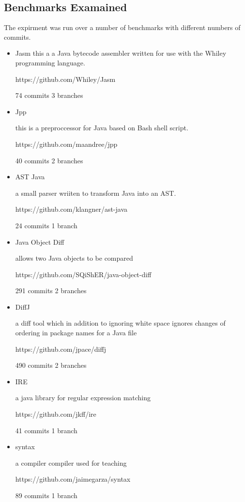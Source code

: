 \subsection{Benchmarks Examained}
 The expirment was run over a number of benchmarks with different numbers of commits.
 
  \begin{itemize}
  \item Jasm
  this a a Java bytecode assembler written for use with the Whiley programming language.
  
  https://github.com/Whiley/Jasm
  
  74 commits 3 branches
  
  \item Jpp
  
  this is a preproccessor for Java based on Bash shell script. 
  
  https://github.com/maandree/jpp
  
  40 commits 2 branches
  
  \item AST Java
  
  a small parser wriiten to transform Java into an AST. 
  
  https://github.com/klangner/ast-java
  
  24 commits 1 branch
  
  \item Java Object Diff
  
  allows two Java objects to be compared 
  
  https://github.com/SQiShER/java-object-diff
  
  291 commits 2 branches
  
  \item DiffJ
  
  a diff tool which in addition to ignoring white space ignores changes of ordering in package names for a Java file 
  
  https://github.com/jpace/diffj
  
  490 commits 2 branches

  \item  IRE
  
  a java library for regular expression matching
  
  https://github.com/jkff/ire
  
  41 commits 1 branch
  
  \item syntax
  
  a compiler compiler used for teaching
  
  https://github.com/jaimegarza/syntax
  
  89 commits 1 branch
    
\end{itemize}




